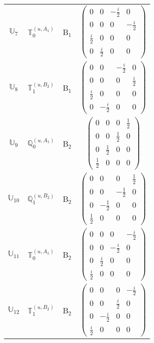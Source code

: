 \documentclass[fleqn,10pt,landscape]{article}
\begin{document}
\begin{itemize}
\begin{center}
\begin{longtable}{c|c|c|c}
$ \mathbb{U}_{7} $ & $\mathbb{T}_{0}^{(u,A_{1})}$ & B$_{1}$ & $\begin{pmatrix} 0 & 0 & - \frac{i}{2} & 0 \\ 0 & 0 & 0 & - \frac{i}{2} \\ \frac{i}{2} & 0 & 0 & 0 \\ 0 & \frac{i}{2} & 0 & 0 \end{pmatrix}$ \\
$ \mathbb{U}_{8} $ & $\mathbb{T}_{1}^{(u,B_{2})}$ & B$_{1}$ & $\begin{pmatrix} 0 & 0 & - \frac{i}{2} & 0 \\ 0 & 0 & 0 & \frac{i}{2} \\ \frac{i}{2} & 0 & 0 & 0 \\ 0 & - \frac{i}{2} & 0 & 0 \end{pmatrix}$ \\ \hline
$ \mathbb{U}_{9} $ & $\mathbb{Q}_{0}^{(u,A_{1})}$ & B$_{2}$ & $\begin{pmatrix} 0 & 0 & 0 & \frac{1}{2} \\ 0 & 0 & \frac{1}{2} & 0 \\ 0 & \frac{1}{2} & 0 & 0 \\ \frac{1}{2} & 0 & 0 & 0 \end{pmatrix}$ \\
$ \mathbb{U}_{10} $ & $\mathbb{Q}_{1}^{(u,B_{2})}$ & B$_{2}$ & $\begin{pmatrix} 0 & 0 & 0 & \frac{1}{2} \\ 0 & 0 & - \frac{1}{2} & 0 \\ 0 & - \frac{1}{2} & 0 & 0 \\ \frac{1}{2} & 0 & 0 & 0 \end{pmatrix}$ \\
$ \mathbb{U}_{11} $ & $\mathbb{T}_{0}^{(u,A_{1})}$ & B$_{2}$ & $\begin{pmatrix} 0 & 0 & 0 & - \frac{i}{2} \\ 0 & 0 & - \frac{i}{2} & 0 \\ 0 & \frac{i}{2} & 0 & 0 \\ \frac{i}{2} & 0 & 0 & 0 \end{pmatrix}$ \\
$ \mathbb{U}_{12} $ & $\mathbb{T}_{1}^{(u,B_{2})}$ & B$_{2}$ & $\begin{pmatrix} 0 & 0 & 0 & - \frac{i}{2} \\ 0 & 0 & \frac{i}{2} & 0 \\ 0 & - \frac{i}{2} & 0 & 0 \\ \frac{i}{2} & 0 & 0 & 0 \end{pmatrix}$ \\ \hline

\end{longtable}
\end{center}
\end{itemize}
\end{document}
